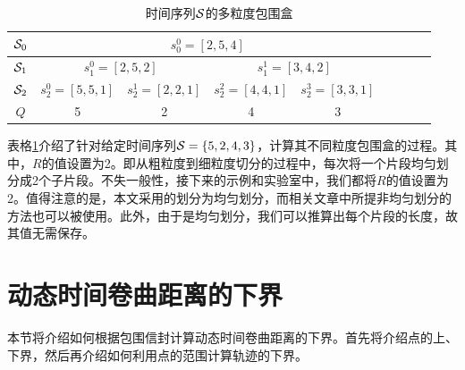 \begin{table}[t]
	\centering  
	\renewcommand\arraystretch{1.2}
	\begin{tabular}{|c|c|c|c|c|c|c|c|c|} 
		\hline
		${\cal S}_{0}$ &  \multicolumn{4}{|c|}{$s_{0}^{0}={[2,5,4]}$} \\ \hline
		${\cal S}_{1}$ & \multicolumn{2}{|c|}{$s_{1}^{0}={[2,5,2]}$} & \multicolumn{2}{|c|}{$s_{1}^{1}={[3,4,2]}$} \\ \hline 
		${\cal S}_{2}$ & \multicolumn{1}{|c|}{$s_{2}^{0}={[5,5,1]}$} & \multicolumn{1}{|c|}{$s_{2}^{1}={[2,2,1]}$} &
		\multicolumn{1}{|c|}{$s_{2}^{2}={[4,4,1]}$} &  \multicolumn{1}{|c|}{$s_{2}^{3}={[3,3,1]}$} \\ \hline 
		$Q$ & 5 & 2 & 4 & 3
		\\ \hline
	\end{tabular}
	\caption{时间序列$\cal S$的多粒度包围盒}
	\label{table:BE}
\end{table}
表格\ref{table:BE}介绍了针对给定时间序列${\cal S}=\{5,2,4,3\}$，计算其不同粒度包围盒的过程。其中，$R$的值设置为2。即从粗粒度到细粒度切分的过程中，每次将一个片段均匀划分成2个子片段。不失一般性，接下来的示例和实验室中，我们都将$R$的值设置为2。值得注意的是，本文采用的划分为均匀划分，而相关文章中所提非均匀划分的方法也可以被使用。此外，由于是均匀划分，我们可以推算出每个片段的长度，故其值无需保存。
 

%
%


\section{动态时间卷曲距离的下界}\label{sec-c5-lowerBound}
 本节将介绍如何根据包围信封计算动态时间卷曲距离的下界。首先将介绍点的上、下界，然后再介绍如何利用点的范围计算轨迹的下界。
 
